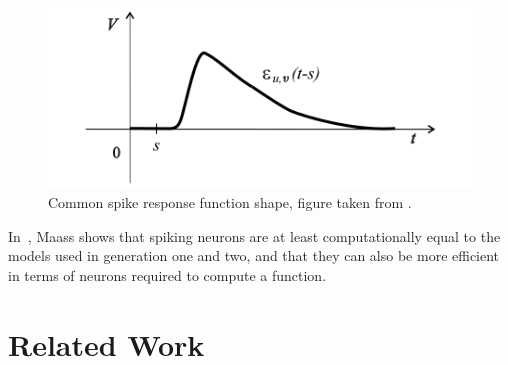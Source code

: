 \begin{figure}[ht]
  \centering
  \includegraphics[width=0.5\linewidth]{fig/response-function-snn}
  \caption{Common spike response function shape, figure taken from \cite{Maass1997}.}
  \label{fig:response-function-snn}
\end{figure}


In~\cite{Maass1997}, Maass shows that spiking neurons are at least
computationally equal to the models used in generation one and two, and that
they can also be more efficient in terms of neurons required to compute a
function.


\section{Related Work}
\cleardoublepage
